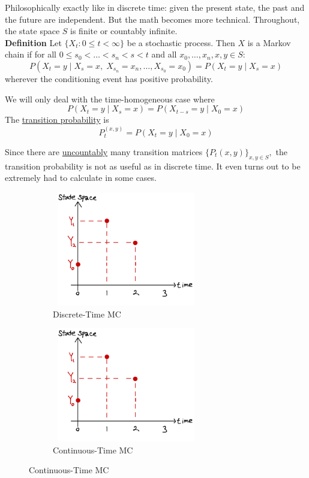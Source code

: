 \documentclass[12pt]{article}
\begin{document}
\newcommand\independent{\protect\mathpalette{\protect\independenT}{\perp}}
\def\independenT#1#2{\mathrel{\rlap{$#1#2$}\mkern2mu{#1#2}}}


Philosophically exactly like in discrete time: given the present state, the past and the future are independent. But the math becomes more technical. Throughout, the state space $S$ is finite or countably infinite.\\

{\bf Definition} Let $\{X_t:0\le t< \infty\}$ be a stochastic process. Then $X$ is a Markov chain if for all $0\le s_0<\ldots<s_n<s<t$ and all $x_0,\ldots,x_n,x,y\in S:$
$$P(X_t=y\;|\;X_s=x,\;X_{s_n}=x_n,\ldots,X_{s_0}=x_0) = P(X_t=y\;|\;X_s=x)$$ 
wherever the conditioning event has positive probability.

\vspace{1\baselineskip}
We will only deal with the time-homogeneous case where
$$P(X_t=y\;|\;X_s=x) = P(X_{t-s}=y\;|\;X_0=x)$$
The \underline{transition probability} is 
$$P_t^{(x,y)} = P(X_t=y\;|\;X_0=x)$$

Since there are \underline{uncountably} many transition matrices $\{P_t(x,y)\}_{x,y\in S},$ the transition probability is not as useful as in discrete time. It even turns out to be extremely had to calculate in some cases.


\begin{figure}[!htbp]
    \centering
    \begin{subfigure}[b]{0.3\textwidth}
        \includegraphics[height=5cm, width=6.5cm]{CTMC_1.jpeg}
        \caption{Discrete-Time MC}
    \end{subfigure}\qquad\qquad
    \begin{subfigure}[b]{0.3\textwidth}
        \includegraphics[height=5cm, width=6.5cm]{CTMC_1.jpeg}
        \caption{Continuous-Time MC}
    \end{subfigure}
\end{figure}
\end{document}
